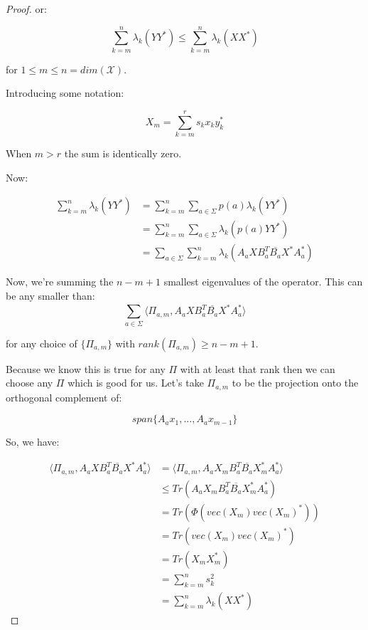 \documentclass{article}
\begin{document}
\begin{proof}
    or:

    \[ 
        \sum_{k=m}^n \lambda_k(YY^*) \le \sum_{k=m}^n \lambda_k \left( XX^* \right) 
    \]
    
    for $1 \le m \le n = dim(\mathcal{X})$.

    Introducing some notation:

    \[ 
        X_m = \sum_{k=m}^r s_k x_k y_k^* 
    \]
    
    When $m>r$ the sum is identically zero.

    Now:

    \begin{align*}
        \sum_{k=m}^n \lambda_k(YY^*) &= \sum_{k=m}^n \sum_{a\in\Sigma} p(a)
        \lambda_k \left( YY^* \right) \\
        &= \sum_{k=m}^n \sum^{}_{a\in\Sigma} \lambda_k \left( p(a) YY^* \right)
        \\
        &= \sum^{}_{a\in\Sigma} \sum^{n}_{k=m}  \lambda_k \left( A_a X B_a^T
    \overline{B_a} X^* A_a^* \right)
    \end{align*}
    
    Now, we're summing the $n-m+1$ smallest eigenvalues of the operator. This
    can be any smaller than:
    \[ 
        \sum^{}_{a\in\Sigma} \langle \Pi_{a,m}, A_a X B_a^T \overline{B_a} X^* A_a^* \rangle 
    \]

    for any choice of $\{\Pi_{a,m}\}$ with $rank \left( \Pi_{a,m} \right) \ge
    n-m+1$.

    Because we know this is true for any $\Pi$ with at least that rank then we
    can choose any $\Pi$ which is good for us. Let's take $\Pi_{a,m}$ to be the
    projection onto the orthogonal complement of:
    
    \[ 
        span\{A_a x_1, \ldots, A_a x_{m-1} \} 
    \]
    
    So, we have:

    \begin{align*}
        \langle \Pi_{a,m}, A_a X B_a^T \overline{B_a} X^* A_a^* \rangle &=
        \langle \Pi_{a,m}, A_a X_m B_a^T \overline{B_a} X_m^* A_a^* \rangle \\
        &\le Tr \left( A_a X_m B_a^T \overline{B_a} X_m^* A_a^* \right) \\
        &= Tr \left( \Phi \left( vec(X_m) vec(X_m)^* \right) \right) \\
        &= Tr \left( vec(X_m) vec(X_m)^* \right) \\
        &= Tr \left( X_m X_m^* \right) \\
        &= \sum_{k=m}^n s_k^2 \\
        &= \sum^{n}_{k=m} \lambda_k \left( X X^* \right)
    \end{align*}
\end{proof}
    
\end{document}
